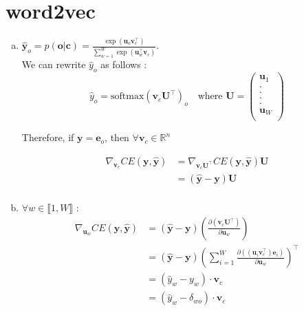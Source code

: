 \documentclass[19pt]{extarticle}
\begin{document}
\section{ word2vec }
\begin{enumerate}[a)]

\item $\hat{\bm{y}}_o = p(\bm{o}|\bm{c}) = \frac{\exp(\bm{u}_o\bm{v}_c^{\top})}{\sum_{w = 1}^W\exp(\bm{u}_w^{\top}\bm{v}_c)}$.\\
We can rewrite $\hat{y}_o$ as follows : $$\hat{y}_o = \text{softmax}(\bm{v}_c\bm{U}^{\top})_o \quad \text{where }\bm{U}=\begin{pmatrix}
\bm{u}_1\\
.\\
.\\
.\\
.\\
\bm{u}_W\\
\end{pmatrix}$$

Therefore, if $\bm{y} = \bm{e}_o$, then $\forall \bm{ v}_c \in \mathds{R}^n$

\begin{equation*}\begin{split}
\nabla_{\bm{v}_c}CE(\bm{y}, \hat{\bm{y}})&= \nabla_{\bm{v}_c\bm{U}^{\top}}CE(\bm{y}, \hat{\bm{y}})\bm{U}\\
&= (\hat{\bm{y}} - \bm{y})\bm{U}\\
\end{split}\end{equation*}

\item \begin{itemize}
 $\forall w \in \llbracket1, W \rrbracket$ : 
\begin{equation*}\begin{split}
\nabla_{\bm{u}_w}CE(\bm{y}, \hat{\bm{y}})&=(\hat{\bm{y}} - \bm{y})(\frac{\partial (\bm{v}_c\bm{U}^{\top})}{\partial \bm{u}_w})\\
&=  (\hat{\bm{y}} - \bm{y})(\sum_{i = 1}^W\frac{\partial ((\bm{u}_i\bm{v}_c^{\top})\bm{e}_i)}{\partial \bm{u}_w})^{\top}\\
&=(\hat{y}_w - y_w)\cdot \bm{v}_c\\
&=  (\hat{y}_w - \delta_{wo})\cdot \bm{v}_c\\
\end{split}\end{equation*}

\end{itemize}



\end{enumerate}
\end{document}
